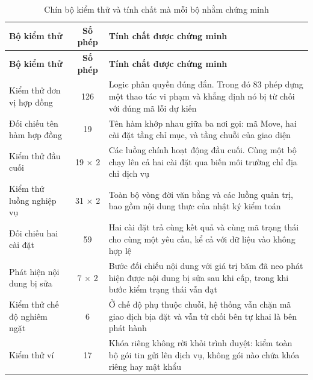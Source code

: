 \begin{longtable}{|p{3.3cm}|c|p{8.4cm}|}
\caption{Chín bộ kiểm thử và tính chất mà mỗi bộ nhằm chứng minh}
\label{tab:test-suites} \\

\hline
\textbf{Bộ kiểm thử} & \textbf{Số phép} & \textbf{Tính chất được chứng minh} \\
\hline
\endfirsthead

\hline
\textbf{Bộ kiểm thử} & \textbf{Số phép} & \textbf{Tính chất được chứng minh} \\
\hline
\endhead

\hline
\endfoot

\hline
\endlastfoot

Kiểm thử đơn vị hợp đồng
& 126
& Logic phân quyền đúng đắn. Trong đó 83 phép dựng một thao tác vi phạm và khẳng định nó bị từ chối với đúng mã lỗi dự kiến
\\ \hline

Đối chiếu tên hàm hợp đồng
& 19
& Tên hàm khớp nhau giữa ba nơi gọi: mã Move, hai cài đặt tầng chỉ mục, và tầng chuỗi của giao diện
\\ \hline

Kiểm thử đầu cuối
& 19 $\times$ 2
& Các luồng chính hoạt động đầu cuối. Cùng một bộ chạy lên cả hai cài đặt qua biến môi trường chỉ địa chỉ dịch vụ
\\ \hline

Kiểm thử luồng nghiệp vụ
& 31 $\times$ 2
& Toàn bộ vòng đời văn bằng và các luồng quản trị, bao gồm nội dung thực của nhật ký kiểm toán
\\ \hline

Đối chiếu hai cài đặt
& 59
& Hai cài đặt trả cùng kết quả và cùng mã trạng thái cho cùng một yêu cầu, kể cả với dữ liệu vào không hợp lệ
\\ \hline

Phát hiện nội dung bị sửa
& 7 $\times$ 2
& Bước đối chiếu nội dung với giá trị băm đã neo phát hiện được nội dung bị sửa sau khi cấp, trong khi bước kiểm trạng thái vẫn đạt
\\ \hline

Kiểm thử chế độ nghiêm ngặt
& 6
& Ở chế độ phụ thuộc chuỗi, hệ thống vẫn chặn mã giao dịch bịa đặt và vẫn từ chối bên tự khai là bên phát hành
\\ \hline

Kiểm thử ví
& 17
& Khóa riêng không rời khỏi trình duyệt: kiểm toàn bộ gói tin gửi lên dịch vụ, không gói nào chứa khóa riêng hay mật khẩu
\\ \hline


\end{longtable}
